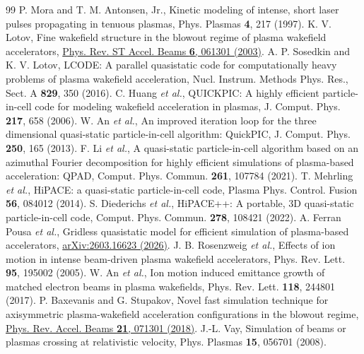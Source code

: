 \documentclass[aps,prab,reprint,floatfix,superscriptaddress,amsmath,amssymb]{revtex4-2}
\begin{document}
\begin{thebibliography}{99}
 P. Mora and T. M. Antonsen, Jr., Kinetic modeling of intense, short laser pulses propagating in tenuous plasmas, Phys. Plasmas \textbf{4}, 217 (1997).
 K. V. Lotov, Fine wakefield structure in the blowout regime of plasma wakefield accelerators, \href{https://doi.org/10.1103/PhysRevSTAB.6.061301}{Phys. Rev. ST Accel. Beams \textbf{6}, 061301 (2003)}.
 A. P. Sosedkin and K. V. Lotov, LCODE: A parallel quasistatic code for computationally heavy problems of plasma wakefield acceleration, Nucl. Instrum. Methods Phys. Res., Sect. A \textbf{829}, 350 (2016).
 C. Huang \textit{et al.}, QUICKPIC: A highly efficient particle-in-cell code for modeling wakefield acceleration in plasmas, J. Comput. Phys. \textbf{217}, 658 (2006).
 W. An \textit{et al.}, An improved iteration loop for the three dimensional quasi-static particle-in-cell algorithm: QuickPIC, J. Comput. Phys. \textbf{250}, 165 (2013).
 F. Li \textit{et al.}, A quasi-static particle-in-cell algorithm based on an azimuthal Fourier decomposition for highly efficient simulations of plasma-based acceleration: QPAD, Comput. Phys. Commun. \textbf{261}, 107784 (2021).
 T. Mehrling \textit{et al.}, HiPACE: a quasi-static particle-in-cell code, Plasma Phys. Control. Fusion \textbf{56}, 084012 (2014).
 S. Diederichs \textit{et al.}, HiPACE++: A portable, 3D quasi-static particle-in-cell code, Comput. Phys. Commun. \textbf{278}, 108421 (2022).
 A. Ferran Pousa \textit{et al.}, Gridless quasistatic model for efficient simulation of plasma-based accelerators, \href{https://arxiv.org/abs/2603.16623}{arXiv:2603.16623 (2026)}.
 J. B. Rosenzweig \textit{et al.}, Effects of ion motion in intense beam-driven plasma wakefield accelerators, Phys. Rev. Lett. \textbf{95}, 195002 (2005).
 W. An \textit{et al.}, Ion motion induced emittance growth of matched electron beams in plasma wakefields, Phys. Rev. Lett. \textbf{118}, 244801 (2017).
 P. Baxevanis and G. Stupakov, Novel fast simulation technique for axisymmetric plasma-wakefield acceleration configurations in the blowout regime, \href{https://doi.org/10.1103/PhysRevAccelBeams.21.071301}{Phys. Rev. Accel. Beams \textbf{21}, 071301 (2018)}.
 J.-L. Vay, Simulation of beams or plasmas crossing at relativistic velocity, Phys. Plasmas \textbf{15}, 056701 (2008).

\end{thebibliography}
\end{document}
